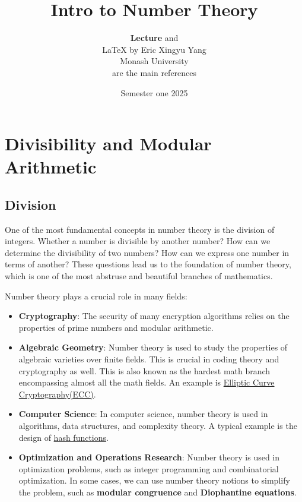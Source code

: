 \documentclass[oneside]{book}
\def\notetitle{Intro to Number Theory}
\def\noteauthor{
    \textbf{Lecture} and\\ 
    {\LaTeX} by Eric Xingyu Yang\\
    Monash University\\
	\textcite{rosenDiscreteMathematicsIts2018,rosenElementaryNumberTheory2010} are the main references
	}
\def\notedate{Semester one 2025}
\begin{document}
\title{\textbf{
		\LARGE{\notetitle} \vspace*{10\baselineskip}}
}
\author{\noteauthor}
\date{\notedate}

\maketitle
\newpage

\tableofcontents
\newpage


\chapter{Divisibility and Modular Arithmetic}
\section{Division}
One of the most fundamental concepts in number theory is the division of integers.
Whether a number is divisible by another number? How can we determine the
divisibility of two numbers? How can we express one number in terms of another?
These questions lead us to the foundation of number theory, which is one of the most
abstruse and beautiful branches of mathematics.

Number theory plays a crucial role in many fields:
\begin{itemize}
	\item \textbf{Cryptography}: The security of many encryption algorithms relies on the properties of prime numbers and modular arithmetic.
	\item \textbf{Algebraic Geometry}: Number theory is used to study the properties of algebraic varieties over finite fields. This is
	      crucial in coding theory and cryptography as well. This is also known as the hardest math branch encompassing almost all the math fields.
	      An example is
	      \href{https://cryptobook.nakov.com/asymmetric-key-ciphers/elliptic-curve-cryptography-ecc}{Elliptic Curve Cryptography(ECC)}.
	\item \textbf{Computer Science}: In computer science, number theory is used in algorithms, data structures, and complexity theory.
	      A typical example is the design of \href{https://en.wikipedia.org/wiki/Hash_function}{hash functions}.
	\item \textbf{Optimization and Operations Research}: Number theory is used in optimization problems, such as integer programming and combinatorial optimization.
	      In some cases, we can use number theory notions to simplify the problem, such as \textbf{modular congruence} and \textbf{Diophantine equations}.
\end{itemize}
\end{document}
